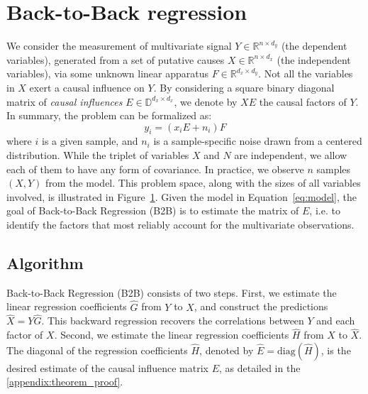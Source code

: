 \documentclass[preprint,12pt,3p]{elsarticle}
\begin{document}


\section{Back-to-Back regression}
\label{sec:algorithm}

\begin{figure}[t!]
  
  \label{fig:b2b}
\end{figure}

We consider the measurement of multivariate signal $Y \in \mathbb{R}^{n \times
d_y}$ (the dependent variables), generated from a set of putative causes $X \in \mathbb{R}^{n \times
d_x}$ (the independent variables), via some unknown linear apparatus $F \in \mathbb{R}^{d_x \times d_y}$.
%
Not all the variables in $X$ exert a causal influence on $Y$.
%
By considering a square binary diagonal matrix of \emph{causal influences} $E
\in \mathbb{D}^{d_x \times d_x}$, we denote by $XE$ the causal factors of $Y$.
%
In summary, the problem can be formalized as:
%
\begin{equation}
    y_i = (x_i E + n_i) F
    \label{eq:model}
\end{equation}
%
where $i$ is a given sample, and $n_i$ is a sample-specific noise drawn from a
centered distribution.
%
While the triplet of variables $X$ and $N$ are independent, we allow each of
them to have any form of covariance.
%
In practice, we observe $n$ samples $(X, Y)$ from the model.
%
This problem space, along with the sizes of all variables involved, is
illustrated in Figure~\ref{fig:b2b}.
%
Given the model in Equation~\cref{eq:model}, the goal of Back-to-Back
Regression (B2B) is to estimate the matrix of $E$, i.e. to identify the factors
that most reliably account for the multivariate observations.

\subsection{Algorithm}


Back-to-Back Regression (B2B) consists of two steps.
%
First, we estimate the linear regression coefficients $\hat G$ from $Y$ to $X$,
and construct the predictions $\hat X = Y \hat G$.
%
This backward regression recovers the correlations between $Y$ and each factor
of $X$.
%
Second, we estimate the linear regression coefficients $\hat H$ from $X$ to
$\hat X$.
%
The diagonal of the regression coefficients $\hat H$, denoted by $\hat{E} =
\text{diag}(\hat{H})$, is the desired estimate of the causal influence matrix
$E$, as detailed in the \ref{appendix:theorem_proof}.
\end{document}
